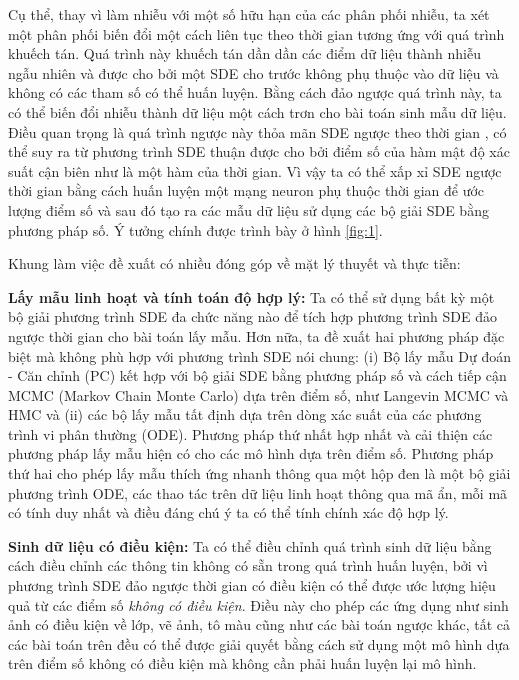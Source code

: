\documentclass{article} %
\begin{document}
Cụ thể, thay vì làm nhiễu với một số hữu hạn của các phân phối nhiễu, ta xét một phân phối biến đổi một cách liên tục theo thời gian tương ứng với quá trình khuếch tán.
Quá trình này khuếch tán dần dần các điểm dữ liệu thành nhiễu ngẫu nhiên và được cho bởi một SDE cho trước không phụ thuộc vào dữ liệu và không có các tham số có thể huấn luyện.
Bằng cách đảo ngược quá trình này, ta có thể biến đổi nhiễu thành dữ liệu một cách trơn cho bài toán sinh mẫu dữ liệu.
Điều quan trọng là quá trình ngược này thỏa mãn SDE ngược theo thời gian \citep{anderson1982reverse}, có thể suy ra từ phương trình SDE thuận được cho bởi điểm số của hàm mật độ xác suất cận biên như là một hàm của thời gian.
Vì vậy ta có thể xấp xỉ SDE ngược thời gian bằng cách huấn luyện một mạng neuron phụ thuộc thời gian để ước lượng điểm số và sau đó tạo ra các mẫu dữ liệu sử dụng các bộ giải SDE bằng phương pháp số.
Ý tưởng chính được trình bày ở hình \ref{fig:1}.

Khung làm việc đề xuất có nhiều đóng góp về mặt lý thuyết và thực tiễn:

\textbf{Lấy mẫu linh hoạt và tính toán độ hợp lý:} Ta có thể sử dụng bất kỳ một bộ giải phương trình SDE đa chức năng nào để tích hợp phương trình SDE đảo ngược thời gian cho bài toán lấy mẫu.
Hơn nữa, ta đề xuất hai phương pháp đặc biệt mà không phù hợp với phương trình SDE nói chung: (i) Bộ lấy mẫu Dự đoán - Căn chỉnh (PC) kết hợp với bộ giải SDE bằng phương pháp số và cách tiếp cận MCMC (Markov Chain Monte Carlo) dựa trên điểm số, như Langevin MCMC \citep{parisi1981correlation} và HMC \citep{neal2011mcmc} và (ii) các bộ lấy mẫu tất định dựa trên dòng xác suất của các phương trình vi phân thường (ODE).
Phương pháp thứ nhất hợp nhất và cải thiện các phương pháp lấy mẫu hiện có cho các mô hình dựa trên điểm số.
Phương pháp thứ hai cho phép lấy mẫu thích ứng nhanh thông qua một hộp đen là một bộ giải phương trình ODE, các thao tác trên dữ liệu linh hoạt thông qua mã ẩn, mỗi mã có tính duy nhất và điều đáng chú ý ta có thể tính chính xác độ hợp lý.

\textbf{Sinh dữ liệu có điều kiện:} Ta có thể điều chỉnh quá trình sinh dữ liệu bằng cách điều chỉnh các thông tin không có sẵn trong quá trình huấn luyện, bởi vì phương trình SDE đảo ngược thời gian có điều kiện có thể được ước lượng hiệu quả từ các điểm số \textit{không có điều kiện}.
Điều này cho phép các ứng dụng như sinh ảnh có điều kiện về lớp, vẽ ảnh, tô màu cũng như các bài toán ngược khác, tất cả các bài toán trên đều có thể được giải quyết bằng cách sử dụng một mô hình dựa trên điểm số không có điều kiện mà không cần phải huấn luyện lại mô hình.
\end{document}
